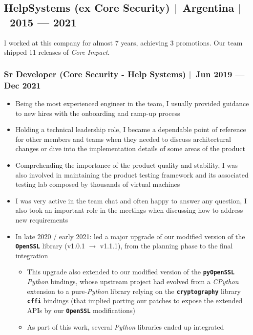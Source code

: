 \documentclass[12pt, a4paper]{article}
\newcommand{\mysep}{{\Large $\mid$}\ }
\newcommand{\timeFrame}[2]{{#1} --- {#2}}
\newcommand{\lib}[1]{\texttt{\textbf{#1}}}
\newcommand{\python}{\emph{Python}}
\begin{document}
    \subsection*{HelpSystems (ex Core Security) \mysep Argentina \mysep \timeFrame{2015}{2021}} \label{subsec:job1}
    I worked at this company for almost 7 years, achieving 3 promotions.
    Our team shipped 11 releases of \emph{Core Impact}.

    \subsubsection*{Sr Developer (Core Security - Help Systems) \mysep \timeFrame{Jun 2019}{Dec 2021}}
    \begin{itemize}
        \item Being the most experienced engineer in the team, I usually
        provided guidance to new hires with the onboarding and ramp-up process
        \item Holding a technical leadership role, I became
        a dependable point of reference for other members and teams
        when they needed to discuss architectural changes
        or dive into the implementation details of some areas of the product
        \item Comprehending the importance of the product quality and stability,
        I was also involved in maintaining the product testing framework
        and its associated testing lab composed by thousands of virtual machines
        \item I was very active in the team chat
        and often happy to answer any question,
        I also took an important role in the meetings
        when discussing how to address new requirements
        \item In late 2020 / early 2021: led a major upgrade of
        our modified version of the \lib{OpenSSL} library (v1.0.1 $\rightarrow$ v1.1.1),
        from the planning phase to the final integration
        \begin{itemize}
            \item This upgrade also extended to our modified version of the \lib{pyOpenSSL} \python{} bindings,
            whose upstream project had evolved from a \emph{CPython} extension to a pure-\python{} library
            relying on the \lib{cryptography} library \lib{cffi} bindings
            (that implied porting our patches to expose the extended APIs by our \lib{OpenSSL} modifications)
            \item As part of this work, several \python{} libraries ended up integrated

\end{itemize}
\end{itemize}
\end{document}

